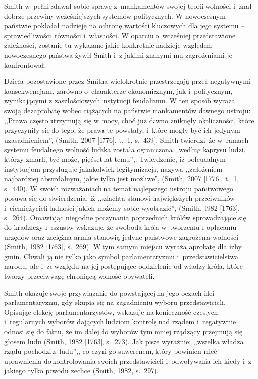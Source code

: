 Smith w~pełni zdawał sobie sprawę z~mankamentów swojej teorii wolności i~znał dobrze przewiny wcześniejszych systemów politycznych. W nowoczesnym państwie pokładał nadzieję na ochronę wartości kluczowych dla jego systemu -- sprawiedliwości, równości i~własności. W oparciu o~wcześniej przedstawione zależności, zostanie tu wykazane jakie konkretnie nadzieje względem nowoczesnego państwa żywił Smith i~z jakimi znanymi mu zagrożeniami je konfrontował.

Dzieła pozostawione przez Smitha wielokrotnie przestrzegają przed negatywnymi konsekwencjami, zarówno o~charakterze ekonomicznym, jak i~politycznym, wynikającymi z~zaszłościowych instytucji feudalizmu. W ten sposób wyraża swoją dezaprobatę wobec ciążących na państwie mankamentów dawnego ustroju: ,,Prawa często utrzymują się w~mocy, choć już dawno zniknęły okoliczności, które przyczyniły się do tego, że prawa te powstały, i~które mogły być ich jedynym uzasadnieniem'', \label{ref:RNDulI78tI5NW}(Smith, 2007 [1776], t.~1, s.~439). Smith twierdzi, że w~ramach systemu feudalnego wolność ludzka została ograniczona ,,według kaprysu ludzi, którzy zmarli, być może, pięćset lat temu'',. Twierdzenie, iż pofeudalnym instytucjom przysługuje jakakolwiek legitymizacja, nazywa ,,założeniem najbardziej absurdalnym, jakie tylko jest możliwe'', \label{ref:RNDSUPttSQRMo}(Smith, 2007 [1776], t.~1, s.~440). W swoich rozważaniach na temat najlepszego ustroju państwowego posuwa się do stwierdzenia, iż ,,szlachta stanowi największych przeciwników i~ciemiężycieli ludności jakich możemy sobie wyobrazić'', \label{ref:RND0qdGYLZow2}(Smith, 1982 [1763], s.~264). Omawiając niegodne poczynania poprzednich królów sprowadzające się do kradzieży i~oszustw wskazuje, że swoboda króla w~tworzeniu i~opłacaniu urzędów oraz zaciężna armia stanowią jedyne państwowe zagrożenia wolności \label{ref:RNDcctWJa8WzG}(Smith, 1982 [1763], s.~269). W tym samym miejscu wyraża aprobatę dla izby gmin. Chwali ją nie tylko jako symbol parlamentaryzmu i~przedstawicielstwa narodu, ale i~ze względu na jej postępujące oddzielenie od władzy króla, które tworzy przeciwwagę chroniącą wolność obywateli.

Smith okazuje swoje przywiązanie do powstającej na jego oczach idei parlamentaryzmu, gdy skupia się na zagadnieniu wyboru przedstawicieli. Opisując elekcję parlamentarzystów, wskazuje na konieczność częstych i~regularnych wyborów dających ludziom kontrolę nad rządem i~negatywnie odnosi się do faktu, że im dalej do wyborów tym mniej rządzący przejmują się głosem ludu \label{ref:RNDGWDyLHaXiI}(Smith, 1982 [1763], s.~273). Jak pisze wyraźnie: ,,wszelka władza rządu pochodzi z~ludu'',, co czyni go suwerenem, który powinien mieć uprawnienia do kontrolowania swoich przedstawicieli i~odwoływania ich kiedy i~z jakiego tylko powodu zechce \label{ref:RND8CG5fqpymD}(Smith, 1982, s.~297).

